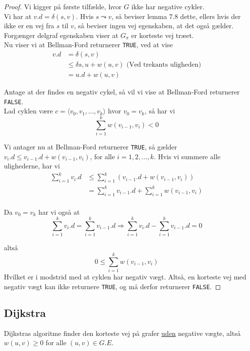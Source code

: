 \begin{proof}
  Vi kigger på første tilfælde, hvor $G$ ikke har negative cykler.\\
  Vi har at $v.d = \delta(s,v)$. Hvis $s \leadsto v$, så beviser lemma 7.8 dette, ellers hvis der ikke er en vej fra $s$ til $v$, så beviser ingen vej egenskaben, at det også gælder. Forgænger delgraf egenskaben viser at $G_\pi$ er korteste vej træet.\\
  Nu viser vi at Bellman-Ford returnerer \texttt{TRUE}, ved at vise
  \begin{align*}
    v.d &= \delta(s,v)\\
        &\leq \delta{s,u} + w(u,v) \text{ (Ved trekants uligheden)}\\
        &= u.d + w(u,v)
  \end{align*}

  Antage at der findes en negativ cykel, så vil vi vise at Bellman-Ford returnerer \texttt{FALSE}.\\
  Lad cyklen være $c = \langle v_0, v_1, ..., v_k\rangle$ hvor $v_0 = v_k$, så har vi
  $$\sum_{i = 1}^k w(v_{i-1},v_i) < 0$$

  Vi antager nu at Bellman-Ford returnerer \texttt{TRUE}, så gælder $v_i.d \leq v_{i-1}.d + w(v_{i-1},v_i)$, for alle $i = 1, 2, ..., k$. Hvis vi summere alle ulighederne, har vi
  \begin{align*}
    \sum_{i=1}^k v_i.d &\leq \sum_{i=1}^k (v_{i-1}.d + w(v_{i-1}, v_i))\\
                       &= \sum_{i=1}^k v_{i-1}.d + \sum_{i=1}^k w(v_{i-1}, v_i)\\
  \end{align*}

  Da $v_0 = v_k$ har vi også at
  $$\sum_{i=1}^k v_i.d = \sum_{i=1}^k v_{i-1}.d \Rightarrow \sum_{i=1}^k v_i.d - \sum_{i=1}^k v_{i-1}.d = 0$$

  altså
  $$0 \leq \sum_{i=1}^k w(v_{i-1}, v_i)$$
  Hvilket er i modstrid med at cyklen har negativ vægt. Altså, en korteste vej med negativ vægt kan ikke returnere \texttt{TRUE}, og må derfor returnerer \texttt{FALSE}.
\end{proof}

\subsection{Dijkstra}
Dijkstras algoritme finder den korteste vej på grafer \underline{uden} negative vægte, altså $w(u,v) \geq 0$ for alle $(u,v) \in G.E$.\\

